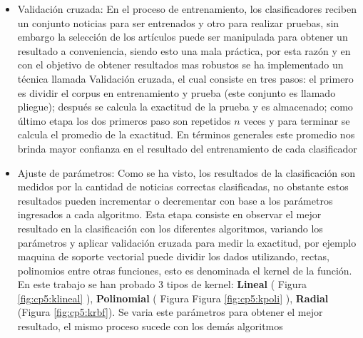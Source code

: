 \begin{enumerate}
\begin{itemize}
    \item Validación cruzada: En el proceso de entrenamiento, los clasificadores reciben un conjunto noticias para ser entrenados y otro para realizar pruebas, sin embargo la selección de los artículos puede ser manipulada para obtener un resultado a conveniencia, siendo esto una mala práctica, por esta razón y en con el objetivo de obtener resultados mas robustos se ha implementado un técnica llamada Validación cruzada, el cual consiste en tres pasos: el primero es dividir el corpus en entrenamiento y prueba (este conjunto es llamado pliegue); después se calcula la exactitud de la prueba y es almacenado; como último etapa los dos primeros paso son repetidos $n$ veces y para terminar  se calcula el promedio de la exactitud. En términos generales este promedio nos brinda mayor confianza en el resultado del entrenamiento de cada clasificador\\

    \item Ajuste de parámetros: Como se ha visto, los resultados de la clasificación son medidos por la cantidad de noticias correctas clasificadas, no obstante estos resultados pueden incrementar o decrementar con base a los parámetros ingresados a cada algoritmo. Esta etapa consiste en observar el mejor resultado en la clasificación con los diferentes algoritmos, variando los parámetros y aplicar validación cruzada para medir la exactitud, por ejemplo maquina de soporte vectorial puede dividir los dados utilizando, rectas, polinomios entre otras funciones,  esto es denominada el kernel de la función. En este trabajo se han probado 3 tipos de kernel: \textbf{Lineal} ( Figura \ref{fig:cp5:klineal} ), \textbf{Polinomial} ( Figura Figura \ref{fig:cp5:kpoli} ), \textbf{Radial} (Figura \ref{fig:cp5:krbf}). Se varia este parámetros para obtener el mejor resultado, el mismo proceso sucede con los demás algoritmos


\end{itemize}
\end{enumerate}
